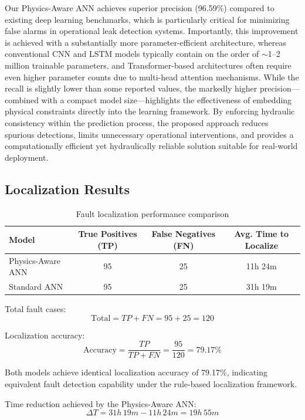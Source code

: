 \documentclass[final,5p,times,twocolumn,authoryear]{elsarticle}
\begin{document}
Our Physics-Aware ANN achieves superior precision (96.59\%) compared to existing deep learning benchmarks, which is particularly critical for minimizing false alarms in operational leak detection systems. Importantly, this improvement is achieved with a substantially more parameter-efficient architecture, whereas conventional CNN and LSTM models typically contain on the order of $\sim$1--2 million trainable parameters, and Transformer-based architectures often require even higher parameter counts due to multi-head attention mechanisms. While the recall is slightly lower than some reported values, the markedly higher precision—combined with a compact model size—highlights the effectiveness of embedding physical constraints directly into the learning framework. By enforcing hydraulic consistency within the prediction process, the proposed approach reduces spurious detections, limits unnecessary operational interventions, and provides a computationally efficient yet hydraulically reliable solution suitable for real-world deployment.

\subsection{Localization Results}

\begin{table}[!htbp]
\centering
\caption{Fault localization performance comparison}
\label{tab:localization_results}
\begin{tabular}{lccc}
\toprule
\textbf{Model} & \textbf{True Positives (TP)} & \textbf{False Negatives (FN)} & \textbf{Avg. Time to Localize} \\
\midrule
Physics-Aware ANN & 95 & 25 & 11h 24m \\
Standard ANN      & 95 & 25 & 31h 19m \\
\bottomrule
\end{tabular}
\end{table}

\bigskip

Total fault cases:
\[
\text{Total} = TP + FN = 95 + 25 = 120
\]

Localization accuracy:
\[
\text{Accuracy} = \frac{TP}{TP + FN} = \frac{95}{120} = 79.17\%
\]

Both models achieve identical localization accuracy of 79.17\%, indicating equivalent fault detection capability under the rule-based localization framework.

\bigskip

Time reduction achieved by the Physics-Aware ANN:
\[
\Delta T = 31h\,19m - 11h\,24m = 19h\,55m
\]
\end{document}
